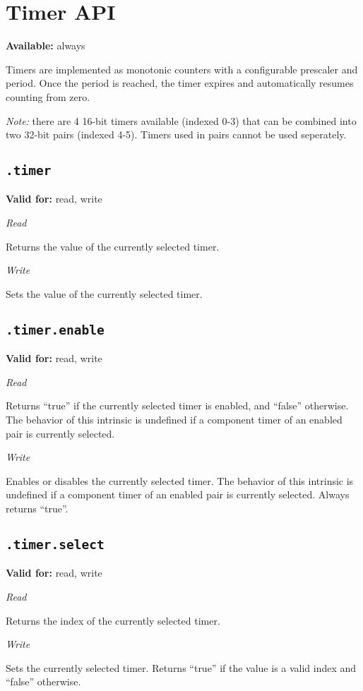 \documentclass{article}
\begin{document}
\section{Timer API}
\textbf{Available:} always

Timers are implemented as monotonic counters with a configurable prescaler and period. Once the period is reached, the timer expires and automatically resumes counting from zero.

\textit{Note:} there are 4 16-bit timers available (indexed 0-3) that can be combined into two 32-bit pairs (indexed 4-5). Timers used in pairs cannot be used seperately.

\subsection{\texttt{.timer}}
\textbf{Valid for:} read, write

\textit{Read}

Returns the value of the currently selected timer.

\textit{Write}

Sets the value of the currently selected timer.

\subsection{\texttt{.timer.enable}}
\textbf{Valid for:} read, write

\textit{Read}

Returns ``true'' if the currently selected timer is enabled, and ``false'' otherwise. The behavior of this intrinsic is undefined if a component timer of an enabled
pair is currently selected.

\textit{Write}

Enables or disables the currently selected timer. The behavior of this intrinsic is undefined if a component timer of an enabled pair is currently selected. Always returns ``true''.

\subsection{\texttt{.timer.select}}
\textbf{Valid for:} read, write

\textit{Read}

Returns the index of the currently selected timer.

\textit{Write}

Sets the currently selected timer. Returns ``true'' if the value is a valid index and ``false'' otherwise.
\end{document}
